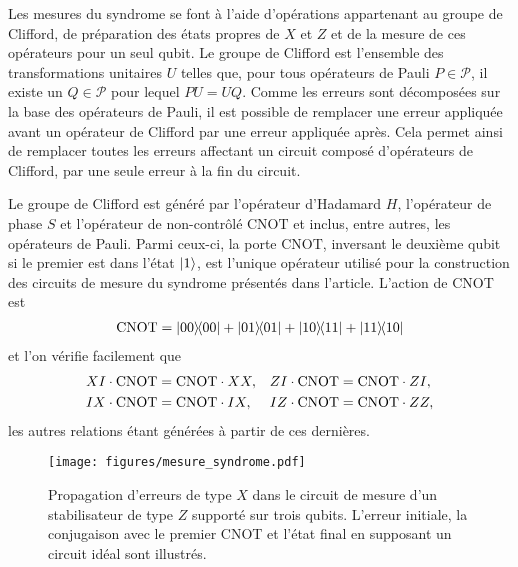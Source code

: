Les mesures du syndrome se font à l'aide d'opérations appartenant au groupe de Clifford,
de préparation des états propres de $X$ et $Z$ et de la mesure de ces opérateurs
pour un seul qubit.
Le groupe de Clifford est l'ensemble des transformations unitaires $U$ telles que,
pour tous opérateurs de Pauli $P \in \mathcal P$,
il existe un $Q \in \mathcal P$ pour lequel $PU = UQ$.
Comme les erreurs sont décomposées sur la base des opérateurs de Pauli,
il est possible de remplacer une erreur appliquée avant un opérateur de Clifford
par une erreur appliquée après.
Cela permet ainsi de remplacer toutes les erreurs affectant un circuit composé d'opérateurs de Clifford,
par une seule erreur à la fin du circuit.

Le groupe de Clifford est généré par l'opérateur d'Hadamard $H$,
l'opérateur de phase $S$ et l'opérateur de non-contrôlé $\text{CNOT}$
et inclus, entre autres, les opérateurs de Pauli.
Parmi ceux-ci,
la porte $\text{CNOT}$,
inversant le deuxième qubit si le premier est dans l'état $\ket{1}$,
est l'unique opérateur utilisé pour la construction des circuits de mesure du syndrome 
présentés dans l'article.
L'action de CNOT est 
\begin{align}
	\text{CNOT} = \op{00}{00} + \op{01}{01} + \op{10}{11} + \op{11}{10}
\end{align}
et l'on vérifie facilement que
\begin{align}
	&XI \cdot \text{CNOT} = \text{CNOT} \cdot XX,
	&&ZI \cdot \text{CNOT} = \text{CNOT} \cdot ZI, \notag \\
	&IX \cdot \text{CNOT} = \text{CNOT} \cdot IX,
	&&IZ \cdot \text{CNOT} = \text{CNOT} \cdot ZZ,
	\label{eq:cnot_pauli}
\end{align}
les autres relations étant générées à partir de ces dernières.

\begin{figure}
	\centering
	\texttt{[image: figures/mesure\_syndrome.pdf]}
	\caption[Exemple de mesure de syndrome]{
		Propagation d'erreurs de type $X$ dans le circuit de mesure d'un
		stabilisateur de type $Z$ supporté sur trois qubits.
		L'erreur initiale, la conjugaison avec le premier CNOT 
		et l'état final en supposant un circuit idéal sont illustrés.
	}
	\label{fig:mesure_syndrome}
\end{figure}

